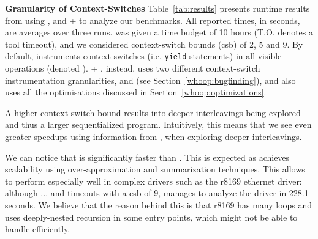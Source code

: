 \noindent
\textbf{Granularity of Context-Switches}\xspace\xspace Table~\ref{tab:results} presents runtime results from using \whoop, \corral and \whoop + \corral to analyze our benchmarks. All reported times, in seconds, are averages over three runs.  \corral was given a time budget of 10 hours (T.O. denotes a tool timeout), and we considered context-switch bounds (csb) of 2, 5 and 9. By default, \corral instruments context-switches (i.e. \texttt{yield} statements) in  all visible operations (denoted \yieldall). \whoop + \corral, instead, uses two different context-switch instrumentation granularities, \yieldcoarse and \yieldmr (see Section~\ref{whoop:bugfinding}), and also uses all the optimisations discussed in Section~\ref{whoop:optimizations}.

A higher context-switch bound results into deeper interleavings being explored and thus a larger sequentialized program. Intuitively, this means that we see even greater speedups using information from \whoop, when exploring deeper interleavings.

We can notice that \whoop is significantly faster than \corral. This is expected as \whoop achieves scalability using over-approximation and summarization techniques. This allows \whoop to perform especially well in complex drivers such as the r8169 ethernet driver: although \corral ... and timeouts with a csb of 9, \whoop manages to analyze the driver in 228.1 seconds. We believe that the reason behind this is that r8169 has many loops and uses deeply-nested recursion in some entry points, which \corral might not be able to handle efficiently.


